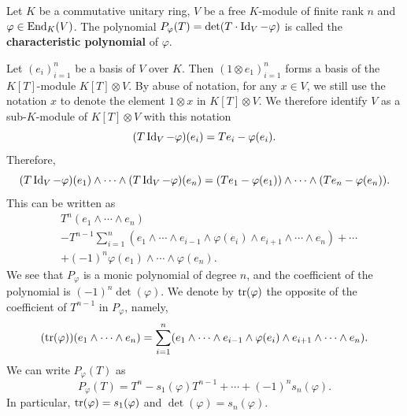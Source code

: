 \begin{definitionenv}
    Let $K$ be a commutative unitary ring,
    $V$ be a free $K$-module of finite rank $n$ and $\varphi \in \operatorname{\mathrm{End}}_{K}(V)$.
    The polynomial $P_\varphi(T) = \det(T \cdot \operatorname{\mathrm{Id}}_{V} - \varphi)$ is called the \textbf{characteristic polynomial} of $\varphi$.

    \quad Let $(e_i)_{i=1}^n$ be a basis of $V$ over $K$.
    Then $(1 \otimes e_1)_{i=1}^{n}$ forms a basis of the $K[T]$-module $K[T] \otimes V$.
    By abuse of notation, for any $x \in V$,
    we still use the notation $x$ to denote the element $1 \otimes x$ in $K[T] \otimes V$.
    We therefore identify $V$ as a sub-$K$-module of $K[T] \otimes V$ with this notation
    $$(T\operatorname{\mathrm{Id}}_{V} - \varphi)(e_i) = Te_i - \varphi(e_i).$$
    Therefore,
    $$(T\operatorname{\mathrm{Id}}_{V} - \varphi)(e_1) \wedge \cdots \wedge (T\operatorname{\mathrm{Id}}_{V} - \varphi)(e_n) = (Te_1 - \varphi(e_1)) \wedge \cdots \wedge (Te_n - \varphi(e_n)).$$
    This can be written as 
    $$\begin{aligned}
        &T^n(e_1 \wedge \cdots \wedge e_n)\\
        & - T^{n-1} \sum_{i=1}^{n}(e_1 \wedge \cdots \wedge e_{i-1} \wedge \varphi(e_i) \wedge e_{i+1} \wedge \cdots \wedge e_n) + \cdots \\
        &+ (-1)^n \varphi(e_1) \wedge \cdots \wedge \varphi(e_n).
    \end{aligned}$$
    We see that $P_{\varphi}$ is a monic polynomial of degree $n$,
    and the coefficient of the polynomial is $(-1)^n \det(\varphi)$.
    We denote by $\operatorname{\mathrm{tr}}(\varphi)$ the opposite of the coefficient of $T^{n-1}$ in $P_{\varphi}$,
    namely,
    $$(\operatorname{\mathrm{tr}} (\varphi))(e_1 \wedge \cdots \wedge e_n) = \sum_{i=1}^{n} (e_1 \wedge \cdots \wedge e_{i-1} \wedge \varphi(e_i) \wedge e_{i+1} \wedge \cdots \wedge e_n).$$
    We can write $P_{\varphi} (T)$ as
    $$P_{\varphi}(T) = T^n - s_1 (\varphi) T^{n-1} + \cdots + (-1)^{n} s_n (\varphi).$$ 
    In particular, $\operatorname{\mathrm{tr}}(\varphi) = s_1 (\varphi)$ and $\det(\varphi) = s_n(\varphi).$
\end{definitionenv}

